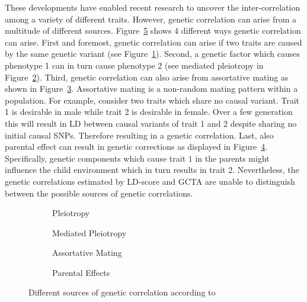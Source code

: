 \documentclass[../header.tex]{subfiles}
\begin{document}
These developments have enabled recent research to uncover the inter-correlation among a variety of different traits.
However, genetic correlation can arise from a multitude of different sources.
Figure~\ref{fig:genetic_correlation} shows 4 different ways genetic correlation can arise.
First and foremost, genetic correlation can arise if two traits are caused by the same genetic variant (see Figure~\ref{fig:pleiotropy}).
Second, a genetic factor which causes phenotype 1 can in turn cause phenotype 2 (see mediated pleiotropy in Figure~\ref{fig:mediated_pleiotropy}).
Third, genetic correlation can also arise from assortative mating as shown in Figure~\ref{fig:assortative_mating}.
Assortative mating is a non-random mating pattern within a population.
For example, consider two traits which share no causal variant.
Trait 1 is desirable in male while trait 2 is desirable in female.
Over a few generation this will result in LD between causal variants of trait 1 and 2 despite sharing no initial causal SNPs.
Therefore resulting in a genetic correlation. 
Last, also parental effect can result in genetic corrections as displayed in Figure~\ref{fig:parental_effects}.
Specifically, genetic components which cause trait $1$ in the parents might influence the child environment which in turn results in trait 2. 
Nevertheless, the genetic correlations estimated by LD-score and GCTA are unable to distinguish between the possible sources of genetic correlations.

\begin{figure}[htp]
  \begin{subfigure}[t]{0.5\textwidth}
    \centering
    \resizebox{0.5\linewidth}{!}{} 
    \caption{Pleiotropy}\label{fig:pleiotropy}
  \end{subfigure}
  \begin{subfigure}[t]{0.5\textwidth}
    \centering
    \resizebox{0.5\linewidth}{!}{} 
    \caption{Mediated Pleiotropy}\label{fig:mediated_pleiotropy}
  \end{subfigure}
  \begin{subfigure}[t]{0.5\textwidth}
    \centering
    \resizebox{0.6\linewidth}{!}{} 
    \caption{Assortative Mating}\label{fig:assortative_mating}
  \end{subfigure}
  \begin{subfigure}[t]{0.5\textwidth}
    \centering
    \resizebox{0.6\linewidth}{!}{}
    \caption{Parental Effects}\label{fig:parental_effects}
  \end{subfigure}
  \caption{Different sources of genetic correlation according to~\citet{Pickrell2016}}\label{fig:genetic_correlation}
\end{figure}
\end{document}
